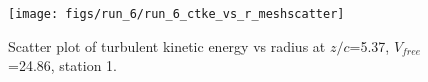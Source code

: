\begin{figure}[H]
\centering
\texttt{[image: figs/run\_6/run\_6\_ctke\_vs\_r\_meshscatter]}
\caption{Scatter plot of turbulent kinetic energy vs radius at $z/c$=5.37, $V_{free}$=24.86, station 1.}
\label{fig:run_6_ctke_vs_r_meshscatter}
\end{figure}


